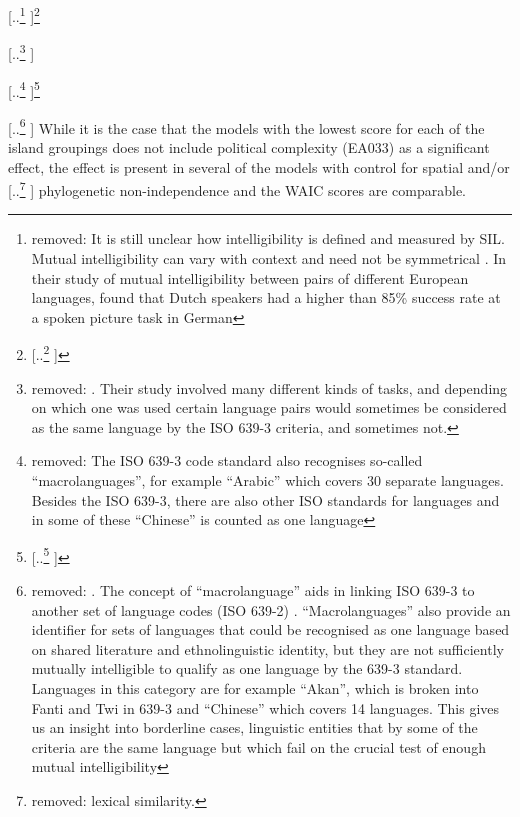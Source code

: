 \documentclass[unnumsec,webpdf,modern,medium]{oup-authoring-template}
\providecommand{\DIFaddtex}[1]{{\protect\color{blue} \sf #1}} %
\providecommand{\DIFdeltex}[1]{{\protect\color{red} [..\footnote{removed: #1} ]}} %
\providecommand{\DIFaddbegin}{} %
\providecommand{\DIFaddend}{} %
\providecommand{\DIFdelbegin}{} %
\providecommand{\DIFdelend}{} %
\providecommand{\DIFadd}[1]{\texorpdfstring{\DIFaddtex{#1}}{#1}} %
\providecommand{\DIFdel}[1]{\texorpdfstring{\DIFdeltex{#1}}{}} %
\newcommand{\DIFscaledelfig}{0.5}
\newlength{\DIFdelgraphicswidth} %
\newlength{\DIFdelgraphicsheight} %
\newcommand{\DIFaddincludegraphics}[2][]{{\color{blue}\fbox{\DIFOincludegraphics[#1]{#2}}}} %
\newcommand{\DIFdelincludegraphics}[2][]{%
\sbox{\DIFdelgraphicsbox}{\DIFOincludegraphics[#1]{#2}}%
\settoboxwidth{\DIFdelgraphicswidth}{\DIFdelgraphicsbox} %
\settoboxtotalheight{\DIFdelgraphicsheight}{\DIFdelgraphicsbox} %
\scalebox{\DIFscaledelfig}{%
\parbox[b]{\DIFdelgraphicswidth}{\usebox{\DIFdelgraphicsbox}\\[-\baselineskip] \rule{\DIFdelgraphicswidth}{0em}}\llap{\resizebox{\DIFdelgraphicswidth}{\DIFdelgraphicsheight}{%
\setlength{\unitlength}{\DIFdelgraphicswidth}%
\begin{picture}(1,1)%
\thicklines\linethickness{2pt} %
{\color[rgb]{1,0,0}\put(0,0){\framebox(1,1){}}}%
{\color[rgb]{1,0,0}\put(0,0){\line( 1,1){1}}}%
{\color[rgb]{1,0,0}\put(0,1){\line(1,-1){1}}}%
\end{picture}%
}\hspace*{3pt}}} %
} %
\DeclareRobustCommand{\DIFaddbegin}{\DIFOaddbegin \let\includegraphics\DIFaddincludegraphics} %
\DeclareRobustCommand{\DIFaddend}{\DIFOaddend \let\includegraphics\DIFOincludegraphics} %
\DeclareRobustCommand{\DIFdelbegin}{\DIFOdelbegin \let\includegraphics\DIFdelincludegraphics} %
\DeclareRobustCommand{\DIFdelend}{\DIFOaddend \let\includegraphics\DIFOincludegraphics} %
\begin{document}
\DIFdel{It is still unclear how intelligibility is defined and measured by SIL. Mutual intelligibility can vary with context and need not be symmetrical \citep[356]{NETTLE1998}. In their study of mutual intelligibility between pairs of different European languages, \citet{gooskens2017measuring} found that Dutch speakers had a higher than 85\% success rate at a spoken picture task in German}\footnote{\DIFdel{For more information on how this study took into account schooling and passive knowledge of the target language by their participants, please see \citet{gooskens2017measuring}.}}%
\addtocounter{footnote}{-1}%
\DIFdel{. Their study involved many different kinds of tasks, and depending on which one was used certain language pairs would sometimes be considered as the same language by the ISO 639-3 criteria, and sometimes not.
}%

\DIFdel{The ISO 639-3 code standard also recognises so-called ``macrolanguages'', for example ``Arabic'' which covers 30 separate languages. Besides the ISO 639-3, there are also other ISO standards for languages and in some of these ``Chinese'' is counted as one language}\footnote{\DIFdel{Many of the other ISO standards for language names are primarily focussed on library use, as evidenced by the fact that the registration authority for ISO 639-2 is the American Library of Congress.}}%
\addtocounter{footnote}{-1}%
\DIFdel{. The concept of ``macrolanguage'' aids in linking ISO 639-3 to another set of language codes (ISO 639-2) . ``Macrolanguages'' also provide an identifier for sets of languages that could be recognised as one language based on shared literature and ethnolinguistic identity, but they are not sufficiently mutually intelligible to qualify as one language by the 639-3 standard. Languages in this category are for example ``Akan'', which is broken into Fanti and Twi in 639-3 and ``Chinese'' which covers 14 languages. This gives us an insight into borderline cases, linguistic entities that by some of the criteria are the same language but which fail on the crucial test of enough mutual intelligibility }\DIFdelend \DIFaddbegin \DIFadd{While it is the case that the models with the lowest score for each of the island groupings does not include political complexity (EA033) as a significant effect, the effect is present in several of the models with control for spatial }\DIFaddend and/or \DIFdelbegin \DIFdel{lexical similarity. 
}\DIFdelend \DIFaddbegin \DIFadd{phylogenetic non-independence and the WAIC scores are comparable.
}\DIFaddend 
\end{document}
